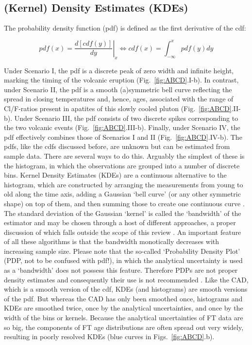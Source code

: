 \documentclass{article}
\begin{document}
\subsection{(Kernel) Density Estimates (KDEs)}

The probability density function (pdf) is defined as the first
derivative of the cdf:

\begin{equation}
pdf(x) = \left.\frac{d[cdf(y)]}{d y}\right\vert_{x} \Leftrightarrow
cdf(x) = \int_{-\infty}^{x}pdf(y) dy
\end{equation}

Under Scenario I, the pdf is a discrete peak of zero width and
infinite height, marking the timing of the volcanic eruption
(Fig.~\ref{fig:ABCD}.I-b). In contrast, under Scenario II, the pdf is
a smooth (a)symmetric bell curve reflecting the spread in closing
temperatures and, hence, ages, associated with the range of
Cl/F-ratios present in apatites of this slowly cooled pluton
(Fig.~\ref{fig:ABCD}.II-b). Under Scenario III, the pdf consists of
two discrete spikes corresponding to the two volcanic events
(Fig.~\ref{fig:ABCD}.III-b). Finally, under Scenario IV, the pdf
effectively combines those of Scenarios I and II
(Fig.~\ref{fig:ABCD}.IV-b). The pdfs, like the cdfs discussed before,
are unknown but can be estimated from sample data. There are several
ways to do this.  Arguably the simplest of these is the histogram, in
which the observations are grouped into a number of discrete
bins. Kernel Density Estimates (KDEs) are a continuous alternative to
the histogram, which are constructed by arranging the measurements
from young to old along the time axis, adding a Gaussian `bell curve'
(or any other symmetric shape) on top of them, and then summing those
to create one continuous curve \citep{silverman1986,
  vermeesch2012b}. The standard deviation of the Gaussian `kernel' is
called the `bandwidth' of the estimator and may be chosen through a
host of different approaches, a proper discussion of which falls
outside the scope of this review \citep{abramson1982, silverman1986,
  botev2010, vermeesch2012b}. An important feature of all these
algorithms is that the bandwidth monotically decreases with increasing
sample size. Please note that the so-called `Probability Density Plot'
(PDP, not to be confused with pdf!), in which the analytical
uncertainty \citep[or 0.6 times the analytical
  uncertainty,][]{brandon1996} is used as a `bandwidth' does not
possess this feature. Therefore PDPs are not proper density estimates
and consequently their use is not recommended \citep{galbraith1998,
  vermeesch2012b}. Like the CAD, which is a smooth version of the cdf,
KDEs (and histograms) are smooth versions of the pdf. But whereas the
CAD has only been smoothed once, histograms and KDEs are smoothed
twice, once by the analytical uncertainties, and once by the width of
the bins or kernels. Because the analytical uncertainties of FT data
are so big, the components of FT age distributions are often spread
out very widely, resulting in poorly resolved KDEs (blue curves in
Figs.~\ref{fig:ABCD}.b).
\end{document}
